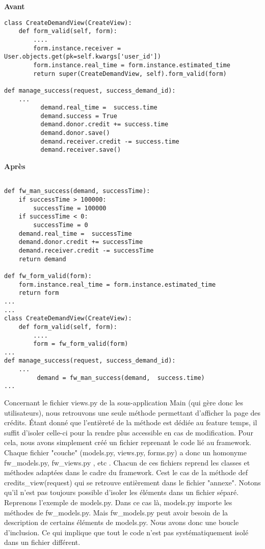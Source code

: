 \begin{minipage}{.5\textwidth}
\begin{center} \textbf{Avant}\end{center}
\begin{lstlisting}
class CreateDemandView(CreateView):
    def form_valid(self, form):
        ....
        form.instance.receiver = User.objects.get(pk=self.kwargs['user_id'])
        form.instance.real_time = form.instance.estimated_time
        return super(CreateDemandView, self).form_valid(form)

def manage_success(request, success_demand_id):
	...
          demand.real_time =  success.time
          demand.success = True
          demand.donor.credit += success.time
          demand.donor.save()
          demand.receiver.credit -= success.time
          demand.receiver.save()
\end{lstlisting} 
\end{minipage}
\hspace{0.3cm}
\begin{minipage}{.5\textwidth}
\begin{center} \textbf{Après}\end{center}
\begin{lstlisting}

def fw_man_success(demand, successTime):
    if successTime > 100000:
        successTime = 100000
    if successTime < 0:
        successTime = 0
    demand.real_time =  successTime
    demand.donor.credit += successTime
    demand.receiver.credit -= successTime  
    return demand

def fw_form_valid(form):
    form.instance.real_time = form.instance.estimated_time
    return form
...
...
class CreateDemandView(CreateView):
    def form_valid(self, form):
        ....
        form = fw_form_valid(form)
...
def manage_success(request, success_demand_id):
	...
         demand = fw_man_success(demand,  success.time)
...
\end{lstlisting} 
\end{minipage}

Concernant le fichier views.py de la sous-application Main (qui gère donc les utilisateurs),  nous retrouvons une seule méthode permettant d'afficher la page des crédits.  Étant donné que l'entièreté de la méthode est dédiée au feature temps,  il suffit d'isoler celle-ci pour la rendre plus accessible en cas de modification.  Pour cela,  nous avons simplement créé un fichier reprenant le code lié au framework.  Chaque fichier "couche" (models.py,  views.py,  forms.py) a donc un homonyme fw\_models.py,  fw\_views.py ,  etc .  Chacun de ces fichiers reprend les classes et méthodes adaptées dans le cadre du framework.  Cest le cas de la méthode def credits\_view(request) qui se retrouve entièrement dans le fichier "annexe".  Notons qu'il n'est pas toujours possible d'isoler les éléments dans un fichier séparé.  Reprenons l'exemple de models.py.  Dans ce cas là,  models.py importe les méthodes de fw\_models.py.  Mais fw\_models.py peut avoir besoin de la description de certains éléments de models.py.  Nous avons donc une boucle d'inclusion.  Ce qui implique que tout le code n'est pas systématiquement isolé dans un fichier différent.  

